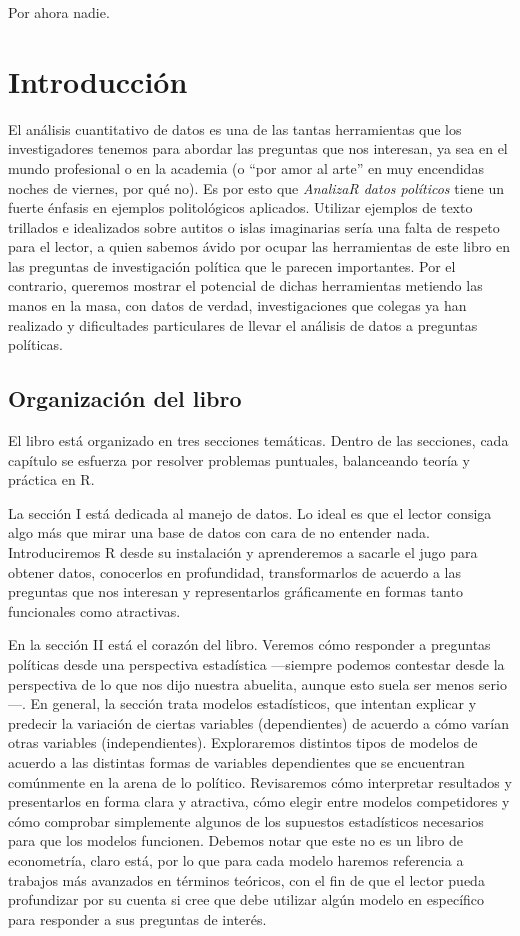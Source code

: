 \documentclass[]{book}
\begin{document}
Por ahora nadie.

\chapter{Introducción}\label{introduccion}

El análisis cuantitativo de datos es una de las tantas herramientas que
los investigadores tenemos para abordar las preguntas que nos interesan,
ya sea en el mundo profesional o en la academia (o ``por amor al arte''
en muy encendidas noches de viernes, por qué no). Es por esto que
\emph{AnalizaR datos políticos} tiene un fuerte énfasis en ejemplos
politológicos aplicados. Utilizar ejemplos de texto trillados e
idealizados sobre autitos o islas imaginarias sería una falta de respeto
para el lector, a quien sabemos ávido por ocupar las herramientas de
este libro en las preguntas de investigación política que le parecen
importantes. Por el contrario, queremos mostrar el potencial de dichas
herramientas metiendo las manos en la masa, con datos de verdad,
investigaciones que colegas ya han realizado y dificultades particulares
de llevar el análisis de datos a preguntas políticas.

\section{Organización del libro}\label{organizacion-del-libro}

El libro está organizado en tres secciones temáticas. Dentro de las
secciones, cada capítulo se esfuerza por resolver problemas puntuales,
balanceando teoría y práctica en R.

 La sección I está dedicada al manejo de datos. Lo ideal es que el
lector consiga algo más que mirar una base de datos con cara de no
entender nada. Introduciremos R desde su instalación y aprenderemos a
sacarle el jugo para obtener datos, conocerlos en profundidad,
transformarlos de acuerdo a las preguntas que nos interesan y
representarlos gráficamente en formas tanto funcionales como atractivas.

 En la sección II está el corazón del libro. Veremos cómo responder a
preguntas políticas desde una perspectiva estadística ---siempre podemos
contestar desde la perspectiva de lo que nos dijo nuestra abuelita,
aunque esto suela ser menos serio---. En general, la sección trata
modelos estadísticos, que intentan explicar y predecir la variación de
ciertas variables (dependientes) de acuerdo a cómo varían otras
variables (independientes). Exploraremos distintos tipos de modelos de
acuerdo a las distintas formas de variables dependientes que se
encuentran comúnmente en la arena de lo político. Revisaremos cómo
interpretar resultados y presentarlos en forma clara y atractiva, cómo
elegir entre modelos competidores y cómo comprobar simplemente algunos
de los supuestos estadísticos necesarios para que los modelos funcionen.
Debemos notar que este no es un libro de econometría, claro está, por lo
que para cada modelo haremos referencia a trabajos más avanzados en
términos teóricos, con el fin de que el lector pueda profundizar por su
cuenta si cree que debe utilizar algún modelo en específico para
responder a sus preguntas de interés.
\end{document}
